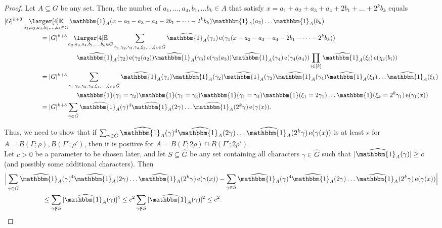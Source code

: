 \documentclass[a4paper,11pt]{article}
\numberwithin{theorem}{section}
\theoremstyle{definition}
\newcommand\id{\mathbbm{1}}
\newcommand{\on}[1]{
	\operatorname{#1}
}
\newcommand{\exx}{
  \mathop{
    \mathchoice{\vcenter{\hbox{\larger[4]$\mathbb{E}$}}}
               {\kern0pt\mathbb{E}}
               {\kern0pt\mathbb{E}}
               {\kern0pt\mathbb{E}}
  }\displaylimits
}
\begin{document}
\begin{proof}
    Let $A \subseteq G$ be any set. Then, the number of $a_1, \dots, a_4, b_1, \dots b_k \in A$ that satisfy $x = a_1 + a_2 + a_3 + a_4 + 2b_1 + \dots + 2^k b_k$ equals
    \begin{align*}&|G|^{k + 3} \exx_{a_2, a_3, a_4, b_1, \dots, b_k \in G} \id_A(x - a_2 - a_3 - a_4 - 2b_1 - \dots - 2^k b_k) \id_A(a_2) \dots \id_A(b_k)\\
    &\hspace{2cm}= |G|^{k + 3} \exx_{a_2, a_3, a_4, b_1, \dots, b_k \in G} \sum_{\gamma_1, \gamma_2, \gamma_3, \gamma_4, \xi_1, \dots, \xi_k\in \hat{G}} \widehat{\id_A}(\gamma_1)\on{e}(\gamma_1(x - a_2 - a_3 - a_4 - 2b_1 - \dots - 2^k b_k))\\
    &\hspace{4cm}\widehat{\id_A}(\gamma_2)\on{e}(\gamma_2(a_2))\widehat{\id_A}(\gamma_3)\on{e}(\gamma_3(a_3))\widehat{\id_A}(\gamma_4)\on{e}(\gamma_4(a_4))\prod_{i \in [k]} \widehat{\id_A}(\xi_i)\on{e}(\chi_i(b_i))\\
    &\hspace{2cm}= |G|^{k + 3}  \sum_{\gamma_1, \gamma_2, \gamma_3, \gamma_4, \xi_1, \dots, \xi_k\in \hat{G}}  \widehat{\id_A}(\gamma_1)\widehat{\id_A}(\gamma_2)\widehat{\id_A}(\gamma_3)\widehat{\id_A}(\gamma_4)\widehat{\id_A}(\xi_1)\dots\widehat{\id_A}(\xi_k)\\
    &\hspace{4cm}\id(\gamma_1= \gamma_2)\id(\gamma_1 = \gamma_3)\id(\gamma_1 = \gamma_4)\id(\xi_1 = 2\gamma_1)\dots \id(\xi_k = 2^k \gamma_1)\on{e}(\gamma_1(x))\\
    &\hspace{2cm}= |G|^{k + 3} \sum_{\gamma \in \hat{G}} \widehat{\id_A}(\gamma)^4 \widehat{\id_A}(2\gamma)\dots \widehat{\id_A}(2^k\gamma)\on{e}(\gamma(x)).
    \end{align*}

    Thus, we need to show that if $\sum_{\gamma \in \hat{G}} \widehat{\id_A}(\gamma)^4 \widehat{\id_A}(2\gamma)\dots \widehat{\id_A}(2^k\gamma)\on{e}(\gamma(x))$ is at least $\varepsilon$ for $A =  B(\Gamma; \rho),  B(\Gamma'; \rho')$, then it is positive for $A = B(\Gamma; 2\rho) \cap B(\Gamma'; 2\rho')$.\\

    Let $c > 0$ be a parameter to be chosen later, and let $S \subseteq \hat{G}$ be any set containing all characters $\gamma \in \hat{G}$ such that $|\widehat{\id_A}(\gamma)| \geq c$ (and possibly some additional characters). Then
    \begin{align}&\Big|\sum_{\gamma \in \hat{G}} \widehat{\id_A}(\gamma)^4 \widehat{\id_A}(2\gamma)\dots \widehat{\id_A}(2^k\gamma)\on{e}(\gamma(x)) - \sum_{\gamma \in S} \widehat{\id_A}(\gamma)^4 \widehat{\id_A}(2\gamma)\dots \widehat{\id_A}(2^k\gamma)\on{e}(\gamma(x))\Big|\nonumber \\
    &\hspace{2cm} \leq \sum_{\gamma \notin S} |\widehat{\id_A}(\gamma)|^4 \leq c^2 \sum_{\gamma \notin S} |\widehat{\id_A}(\gamma)|^2 \leq c^2.\label{passingtolargeFCsInsumsofgenbohrs}\end{align}


\end{proof}
\end{document}
